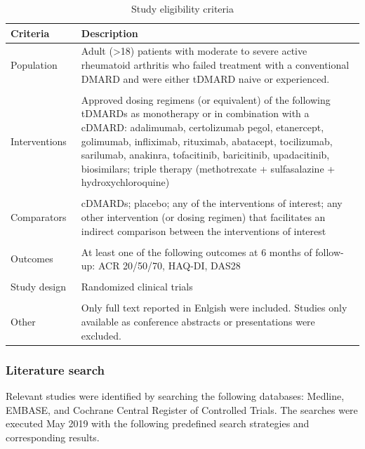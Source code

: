 \documentclass[11pt,final,fleqn]{article}
\theoremstyle{plain}
\begin{document}
\begin{appendices}
\begin{table}[!ht]
\begin{center}
\scriptsize
\begin{threeparttable}
\caption{Study eligibility criteria} \label{tbl:study-eligibility}
\begin{tabular}{p{0.20\linewidth}p{0.80\linewidth}}
\hline
\multicolumn{1}{l}{Criteria} & \multicolumn{1}{l}{Description}\\
\hline
Population & Adult (>18) patients with moderate to severe active rheumatoid arthritis who failed treatment with a conventional DMARD and were either tDMARD naive or experienced. \\
&\\
Interventions & Approved dosing regimens (or equivalent) of the following tDMARDs as monotherapy or in combination with a cDMARD: adalimumab, certolizumab pegol, etanercept, golimumab, infliximab, rituximab, abatacept, tocilizumab, sarilumab, anakinra, tofacitinib, baricitinib, upadacitinib, biosimilars; triple therapy (methotrexate + sulfasalazine + hydroxychloroquine)\\
& \\
Comparators & cDMARDs; placebo; any of the interventions of interest; any other intervention (or dosing regimen) that facilitates an indirect comparison between the interventions of interest \\
&\\
Outcomes & At least one of the following outcomes at 6 months of follow-up: ACR 20/50/70, HAQ-DI, DAS28 \\
&\\
Study design & Randomized clinical trials \\
&\\
Other & Only full text reported in Enlgish were included. Studies only available as conference abstracts or presentations were excluded. \\
\hline
\end{tabular}
\scriptsize
\end{threeparttable}
\end{center}
\end{table}

\FloatBarrier

\subsubsection{Literature search}
Relevant studies were identified by searching the following databases: Medline, EMBASE, and Cochrane Central Register of Controlled Trials. The searches were executed May 2019 with the following predefined search strategies and corresponding results.



\end{appendices}
\end{document}
